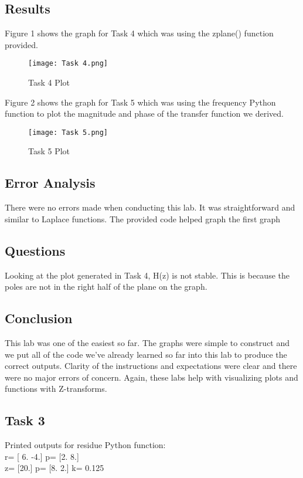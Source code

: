 \documentclass[12pt]{report}
\begin{document}
\section{Results}
Figure 1 shows the graph for Task 4 which was using the zplane() function provided. 

\begin{figure}[ht]
\begin{center}
\texttt{[image: Task 4.png]}
\caption{Task 4 Plot}
\end{center}
\end{figure}

\noindent  Figure 2 shows the graph for Task 5 which was using the frequency Python function to plot the magnitude and phase of the transfer function we derived.

\begin{figure}[ht]
\begin{center}
\texttt{[image: Task 5.png]}
\caption{Task 5 Plot}
\end{center}
\end{figure}

\section{Error Analysis}
There were no errors made when conducting this lab. It was straightforward and similar to Laplace functions. The provided code helped graph the first graph

\section{Questions}
Looking at the plot generated in Task 4, H(z) is not stable. This is because the poles are not in the right half of the plane on the graph. 

\section{Conclusion}
This lab was one of the easiest so far. The graphs were simple to construct and we put all of the code we've already learned so far into this lab to produce the correct outputs. Clarity of the instructions and expectations were clear and there were no major errors of concern. Again, these labs help with visualizing plots and functions with Z-transforms. 

\begin{appendices}
\chapter{Task 3}

Printed outputs for residue Python function: \\

\noindent r=  [ 6. -4.] \indent p=  [2. 8.]\\

\noindent z=  [20.] \indent p=  [8. 2.] \indent k=  0.125

\end{appendices}
\end{document}
